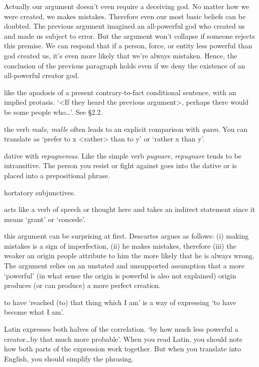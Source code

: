 Actually our argument doesn't even require a deceiving god. No matter how we were created, we makes mistakes. Therefore even our most basic beliefs can be doubted. The previous argument imagined an all-powerful god who created us and made us subject to error. But the argument won't collapse if someone rejects this premise. We can respond that if a person, force, or entity less powerful than god created us, it's even more likely that we're always mistaken. Hence, the conclusion of the previous paragraph holds even if we deny the existence of an all-powerful creator god.

 like the apodosis of a present contrary-to-fact conditional sentence, with an implied protasis. `<If they heard the previous argument>, perhaps there would be some people who\dots'. See §2.2.

 the verb \textit{malo, malle} often leads to an explicit comparison with \textit{quam}. You can translate as `prefer to x <rather> than to y' or `rather x than y'.

 dative with \textit{repugnemus}. Like the simple verb \textit{pugnare}, \textit{repugnare} tends to be intransitive. The person you resist or fight against goes into the dative or is placed into a prepositional phrase.

 hortatory subjunctives.

 acts like a verb of speech or thought here and takes an indirect statement since it means `grant' or `concede'.

 this argument can be surprising at first. Descartes argues as follows: (i) making mistakes is a sign of imperfection, (ii) he makes mistakes, therefore (iii) the weaker an origin people attribute to him the more likely that he is always wrong. The argument relies on an unstated and unsupported assumption that a more `powerful' (in what sense the origin is powerful is also not explained) origin produces (or can produce) a more perfect creation.

 to have `reached (to) that thing which I am' is a way of expressing `to have become what I am'.

 Latin expresses both halves of the correlation. `by how much less powerful a creator\dots by that much more probable'. When you read Latin, you should note how both parts of the expression work together. But when you translate into English, you should simplify the phrasing.

